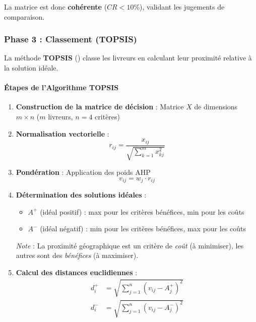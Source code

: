 \documentclass[11pt,a4paper]{report}
\begin{document}
La matrice est donc \textbf{cohérente} ($CR < 10\%$), validant les jugements de comparaison.


\subsubsection{Phase 3 : Classement (TOPSIS)}

La méthode \textbf{TOPSIS} () classe les livreurs en calculant leur proximité relative à la solution idéale.

\paragraph{Étapes de l'Algorithme TOPSIS}

\begin{enumerate}
    \item \textbf{Construction de la matrice de décision} : Matrice $X$ de dimensions $m \times n$ ($m$ livreurs, $n=4$ critères)

    \item \textbf{Normalisation vectorielle} :
    \begin{equation}
        r_{ij} = \frac{x_{ij}}{\sqrt{\sum_{k=1}^{m} x_{kj}^2}}
        \label{eq:topsis_normalize}
    \end{equation}

    \item \textbf{Pondération} : Application des poids AHP
    \begin{equation}
        v_{ij} = w_j \cdot r_{ij}
        \label{eq:topsis_weighted}
    \end{equation}

    \item \textbf{Détermination des solutions idéales} :
    \begin{itemize}
        \item $A^+$ (idéal positif) : max pour les critères bénéfices, min pour les coûts
        \item $A^-$ (idéal négatif) : min pour les critères bénéfices, max pour les coûts
    \end{itemize}

    \textit{Note} : La proximité géographique est un critère de \textit{coût} (à minimiser), les autres sont des \textit{bénéfices} (à maximiser).

    \item \textbf{Calcul des distances euclidiennes} :
    \begin{align}
        d_i^+ &= \sqrt{\sum_{j=1}^{n} (v_{ij} - A_j^+)^2} \label{eq:distance_positive} \\
        d_i^- &= \sqrt{\sum_{j=1}^{n} (v_{ij} - A_j^-)^2} \label{eq:distance_negative}
    \end{align}


\end{enumerate}
\end{document}
